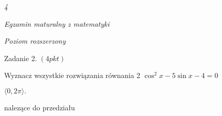 \documentclass[a4paper,12pt]{article}
\begin{document}
{\it 4}

{\it Egzamin maturalny z matematyki}

{\it Poziom rozszerzony}

Zadanie 2. $(4pkt)$

Wyznacz wszystkie rozwiązania równania 2 $\cos^{2}x-5\sin x-4=0$

$\langle 0, 2\pi\rangle.$

nalezące do przedziału
\end{document}

